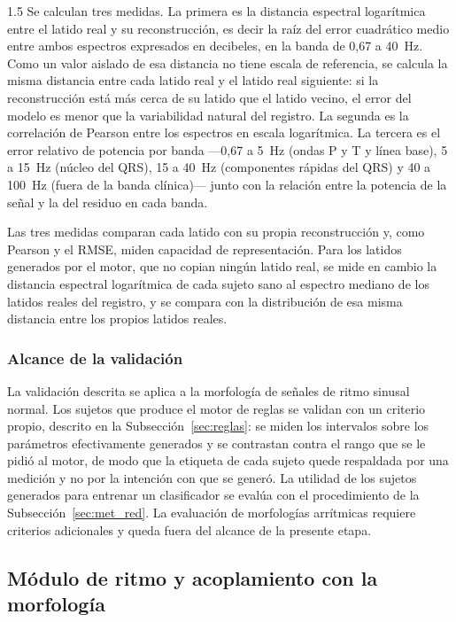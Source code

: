 \begin{spacing}{1.5}
Se calculan tres medidas. La primera es la distancia espectral logarítmica entre el latido real y su reconstrucción, es decir la raíz del error cuadrático medio entre ambos espectros expresados en decibeles, en la banda de 0,67 a 40~Hz. Como un valor aislado de esa distancia no tiene escala de referencia, se calcula la misma distancia entre cada latido real y el latido real siguiente: si la reconstrucción está más cerca de su latido que el latido vecino, el error del modelo es menor que la variabilidad natural del registro. La segunda es la correlación de Pearson entre los espectros en escala logarítmica. La tercera es el error relativo de potencia por banda ---0,67 a 5~Hz (ondas P y T y línea base), 5 a 15~Hz (núcleo del QRS), 15 a 40~Hz (componentes rápidas del QRS) y 40 a 100~Hz (fuera de la banda clínica)--- junto con la relación entre la potencia de la señal y la del residuo en cada banda.

Las tres medidas comparan cada latido con su propia reconstrucción y, como Pearson y el RMSE, miden capacidad de representación. Para los latidos generados por el motor, que no copian ningún latido real, se mide en cambio la distancia espectral logarítmica de cada sujeto sano al espectro mediano de los latidos reales del registro, y se compara con la distribución de esa misma distancia entre los propios latidos reales.

\subsubsection{Alcance de la validación}

La validación descrita se aplica a la morfología de señales de ritmo sinusal normal. Los sujetos que produce el motor de reglas se validan con un criterio propio, descrito en la Subsección~\ref{sec:reglas}: se miden los intervalos sobre los parámetros efectivamente generados y se contrastan contra el rango que se le pidió al motor, de modo que la etiqueta de cada sujeto quede respaldada por una medición y no por la intención con que se generó. La utilidad de los sujetos generados para entrenar un clasificador se evalúa con el procedimiento de la Subsección~\ref{sec:met_red}. La evaluación de morfologías arrítmicas requiere criterios adicionales y queda fuera del alcance de la presente etapa.

\subsection{Módulo de ritmo y acoplamiento con la morfología}


\end{spacing}
